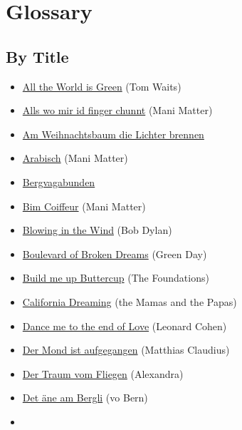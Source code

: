 \documentclass[
]{book}
\providecommand{\tightlist}{%
  \setlength{\itemsep}{0pt}\setlength{\parskip}{0pt}}
\let\stdsection\section
\renewcommand\section{\clearpage\stdsection}
\begin{document}
\hypertarget{glossary}{%
\chapter{Glossary}\label{glossary}}

\hypertarget{by-title}{%
\section{By Title}\label{by-title}}

\begin{itemize}
\tightlist
\item
  \protect\hyperlink{selected-songs-all-the-world-is-green}{All the World is Green} (Tom Waits)
\item
  \protect\hyperlink{mundart-und-deutsch-alls-wo-mir-id-finger-chunnt}{Alls wo mir id finger chunnt} (Mani Matter)
\item
  \protect\hyperlink{weihnachten-am-weihnachtsbaume-die-lichter-brennen}{Am Weihnachtsbaum die Lichter brennen}
\item
  \protect\hyperlink{mundart-und-deutsch-arabisch}{Arabisch} (Mani Matter)
\item
  \protect\hyperlink{volsklieder-bergvagabunden}{Bergvagabunden}
\item
  \protect\hyperlink{mundart-und-deutsch-bim-coiffeur}{Bim Coiffeur} (Mani Matter)
\item
  \protect\hyperlink{classics-blowing-in-the-wind}{Blowing in the Wind} (Bob Dylan)
\item
  \protect\hyperlink{classics-boulevard-of-broken-dreams}{Boulevard of Broken Dreams} (Green Day)
\item
  \protect\hyperlink{selected-songs-build-me-up-buttercup}{Build me up Buttercup} (The Foundations)
\item
  \protect\hyperlink{classics-calafornia-dreaming}{California Dreaming} (the Mamas and the Papas)
\item
  \protect\hyperlink{selected-songs-dance-me-to-the-end-of-love}{Dance me to the end of Love} (Leonard Cohen)
\item
  \protect\hyperlink{mundart-und-deutsch-der-mond}{Der Mond ist aufgegangen} (Matthias Claudius)
\item
  \protect\hyperlink{mundart-und-deutsch-der-traum-vom-fliegen}{Der Traum vom Fliegen} (Alexandra)
\item
  \protect\hyperlink{mundart-und-deutsch-det-ane-am-bergli}{Det äne am Bergli} (vo Bern)
\item

\end{itemize}
\end{document}

